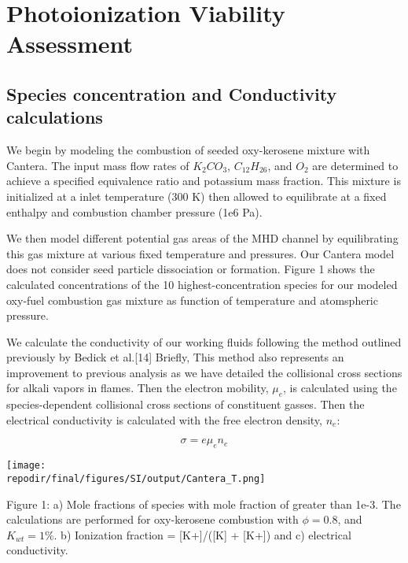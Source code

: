 
\section{Photoionization Viability Assessment}


\hypertarget{species-concentration-and-conductivity-calculations}{%
\subsection{Species concentration and Conductivity calculations}\label{species-concentration-and-conductivity-calculations}}

We begin by modeling the combustion of seeded oxy-kerosene mixture with Cantera. The input mass flow rates of $K_2CO_3$, $C_{12}H_{26}$, and $O_2$ are determined to achieve a specified equivalence ratio and potassium mass fraction. This mixture is initialized at a inlet temperature (300 K) then allowed to equilibrate at a fixed enthalpy and combustion chamber pressure (1e6 Pa).

We then model different potential gas areas of the MHD channel by equilibrating this gas mixture at various fixed temperature and pressures. Our Cantera model does not consider seed particle dissociation or formation. Figure 1 shows the calculated concentrations of the 10 highest-concentration species for our modeled oxy-fuel combustion gas mixture as function of temperature and atomspheric pressure.

We calculate the conductivity of our working fluids following the method outlined previously by Bedick et al.{[}14{]} Briefly, This method also represents an improvement to previous analysis as we have detailed the collisional cross sections for alkali vapors in flames. Then the electron mobility, \(\mu_{e}\), is calculated using the species-dependent collisional cross sections of constituent gasses. Then the electrical conductivity is calculated with the free electron density, \(n_{e}\):

\begin{equation}
\sigma = e\mu_{e}n_{e}
\end{equation}


\texttt{[image: \\repodir/final/figures/SI/output/Cantera\_T.png]}

Figure 1: a) Mole fractions of species with mole fraction of greater than 1e-3. The calculations are performed for oxy-kerosene combustion with \(\phi = 0.8\), and \(K_{wt} = 1\%\). b) Ionization fraction = {[}K+{]}/({[}K{]} + {[}K+{]}) and c) electrical conductivity.


